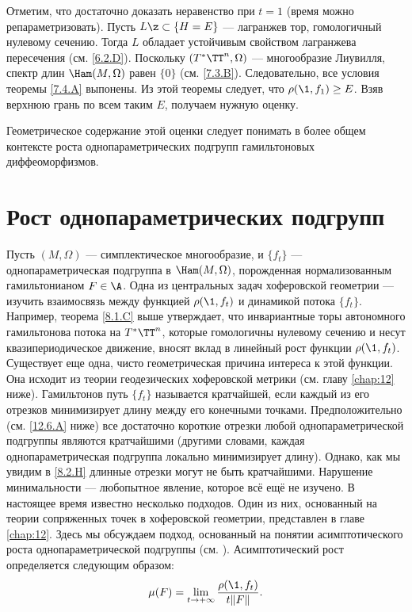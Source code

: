 Отметим, что достаточно доказать неравенство при $t = 1$ (время можно репараметризовать).
Пусть $L \z\subset \{H = E\}$ --- лагранжев тор, гомологичный нулевому сечению.
Тогда $L$ обладает устойчивым свойством лагранжева пересечения (см. \ref{6.2.D}).
Поскольку $(T^\ast \TT^n, \Omega)$ --- многообразие Лиувилля, спектр длин $\Ham (M, \Omega)$ равен $\{0\}$ (см. \ref{7.3.B}).
Следовательно, все условия теоремы \ref{7.4.A} выпонены.
Из этой теоремы следует, что $\rho (\1, f_1) \ge E$.
Взяв верхнюю грань по всем таким $E$, получаем нужную оценку.
\qeds

Геометрическое содержание этой оценки следует понимать в более общем контексте роста однопараметрических подгрупп гамильтоновых диффеоморфизмов.


\section{Рост однопараметрических подгрупп}
Пусть $(M, \Omega)$ --- симплектическое многообразие, и $\{f_t\}$ --- однопараметрическая подгруппа в $\Ham (M, \Omega)$, порожденная нормализованным гамильтонианом $F \in \A$.
Одна из центральных задач хоферовской геометрии --- изучить взаимосвязь между функцией $\rho (\1, f_t)$ и динамикой потока $\{f_t\}$.
Например, теорема \ref{8.1.C} выше утверждает, что инвариантные торы автономного гамильтонова потока на $T^\ast \TT^n$, которые гомологичны нулевому сечению и несут квазипериодическое движение, вносят вклад в линейный рост функции $\rho (\1, f_t)$.
Существует еще одна, чисто геометрическая причина интереса к этой функции.
Она исходит из теории геодезических хоферовской метрики (см. главу \ref{chap:12} ниже).
Гамильтонов путь $\{f_t\}$ называется кратчайшей, если каждый из его отрезков минимизирует длину между его конечными точками.
Предположительно (см. \ref{12.6.A} ниже) все достаточно короткие отрезки любой однопараметрической подгруппы являются кратчайшими (другими словами, каждая однопараметрическая подгруппа локально минимизирует длину).
Однако, как мы увидим в \ref{8.2.H} длинные отрезки могут не быть кратчайшими.
Нарушение минимальности --- любопытное явление, которое всё ещё не изучено.
В настоящее время известно несколько подходов.
Один из них, основанный на теории сопряженных точек в хоферовской геометрии, представлен в главе \ref{chap:12}.
Здесь мы обсуждаем подход, основанный на понятии асимптотического роста однопараметрической подгруппы (см. \cite{BP2}).
Асимптотический рост определяется следующим образом:
\[\mu(F)=\lim_{t \to + \infty}\frac{\rho (\1, f_t)}{ t \| F \|}.\]

